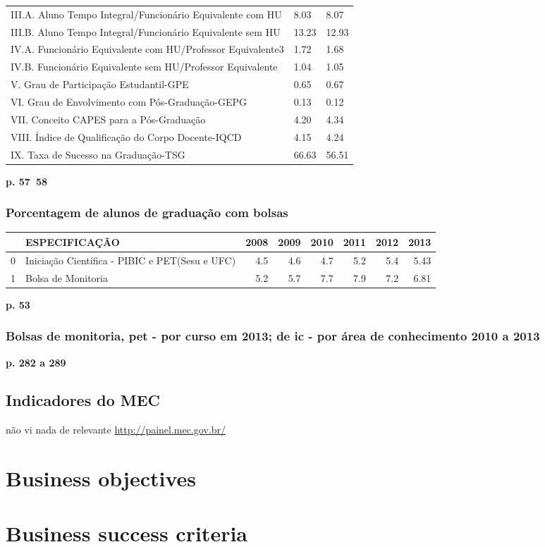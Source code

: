 \documentclass{article}
\begin{document}
\begin{tabular}{lll}
III.A. Aluno Tempo Integral/Funcionário Equivalente com HU  &  8.03 &  8.07 \\
III.B. Aluno Tempo Integral/Funcionário Equivalente sem HU  &  13.23 &  12.93 \\
IV.A. Funcionário Equivalente com HU/Professor Equivalente3 &  1.72 &  1.68 \\
IV.B. Funcionário Equivalente sem HU/Professor Equivalente  &  1.04 &  1.05 \\
V. Grau de Participação Estudantil-GPE                      &  0.65 &  0.67 \\
VI. Grau de Envolvimento com Pós-Graduação-GEPG             &  0.13 &  0.12 \\
VII. Conceito CAPES para a Pós-Graduação                    &  4.20 &  4.34 \\
VIII. Índice de Qualificação do Corpo Docente-IQCD          &  4.15 &  4.24 \\
IX. Taxa de Sucesso na Graduação-TSG                        &  66.63 &  56.51 \\
\bottomrule
\end{tabular}
\textbf{p. 57~58}

\subsubsection*{Porcentagem de alunos de graduação com bolsas}
\begin{tabular}{llrrrrrr}
\toprule
{} &                                   ESPECIFICAÇÃO &  2008 &  2009 &  2010 &  2011 &  2012 &  2013 \\
\midrule
0 &  Iniciação Científica - PIBIC e PET(Sesu e UFC) &   4.5 &   4.6 &   4.7 &   5.2 &   5.4 &  5.43 \\
1 &                              Bolsa de Monitoria &   5.2 &   5.7 &   7.7 &   7.9 &   7.2 &  6.81 \\
\bottomrule
\end{tabular}

\textbf{p. 53}

\subsubsection*{Bolsas de monitoria, pet - por curso em 2013; de ic - por área de conhecimento 2010 a 2013}
\textbf{p. 282 a 289}

\subsection*{Indicadores do MEC}
não vi nada de relevante
\url{http://painel.mec.gov.br/}

\section*{Business objectives}

\section*{Business success criteria}

\cite{anuario_2014_base_2013}
\cite{pdi_ufc}



\end{document}

